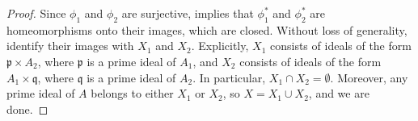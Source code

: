 \begin{proof}
Since \(\phi_1\) and \(\phi_2\) are surjective,  implies that \(\phi_1^*\) and \(\phi_2^*\) are homeomorphisms onto their images, which are closed.
Without loss of generality, identify their images with \(X_1\) and \(X_2\).
Explicitly, \(X_1\) consists of ideals of the form \(\mathfrak{p} \times A_2\), where \(\mathfrak{p}\) is a prime ideal of \(A_1\), and \(X_2\) consists of ideals of the form \(A_1 \times \mathfrak{q}\), where \(\mathfrak{q}\) is a prime ideal of \(A_2\).
In particular, \(X_1 \cap X_2 = \emptyset\).
Moreover, any prime ideal of \(A\) belongs to either \(X_1\) or \(X_2\), so \(X = X_1 \cup X_2\), and we are done.
\end{proof}